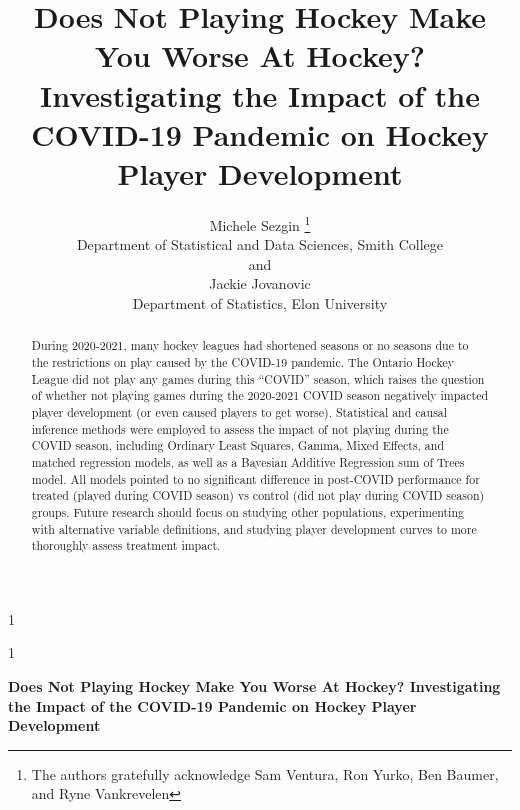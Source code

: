 \documentclass[12pt]{article}
\newcommand{\blind}{1}
\begin{document}
\def\spacingset#1{\renewcommand{\baselinestretch}%
{#1}\small\normalsize} \spacingset{1}



\blind
{
  \title{\bf Does Not Playing Hockey Make You Worse At Hockey?
Investigating the Impact of the COVID-19 Pandemic on Hockey Player
Development}

  \author{
        Michele Sezgin \thanks{The authors gratefully acknowledge Sam
Ventura, Ron Yurko, Ben Baumer, and Ryne Vankrevelen} \\
    Department of Statistical and Data Sciences, Smith College\\
     and \\     Jackie Jovanovic \\
    Department of Statistics, Elon University\\
      }
  \maketitle
} \fi

\blind
{
  \bigskip
  \bigskip
  \bigskip
  \begin{center}
    {\LARGE\bf Does Not Playing Hockey Make You Worse At Hockey?
Investigating the Impact of the COVID-19 Pandemic on Hockey Player
Development}
  \end{center}
  \medskip
} \fi

\bigskip
\begin{abstract}
During 2020-2021, many hockey leagues had shortened seasons or no
seasons due to the restrictions on play caused by the COVID-19 pandemic.
The Ontario Hockey League did not play any games during this ``COVID''
season, which raises the question of whether not playing games during
the 2020-2021 COVID season negatively impacted player development (or
even caused players to get worse). Statistical and causal inference
methods were employed to assess the impact of not playing during the
COVID season, including Ordinary Least Squares, Gamma, Mixed Effects,
and matched regression models, as well as a Bayesian Additive Regression
sum of Trees model. All models pointed to no significant difference in
post-COVID performance for treated (played during COVID season) vs
control (did not play during COVID season) groups. Future research
should focus on studying other populations, experimenting with
alternative variable definitions, and studying player development curves
to more thoroughly assess treatment impact.
\end{abstract}
\end{document}

